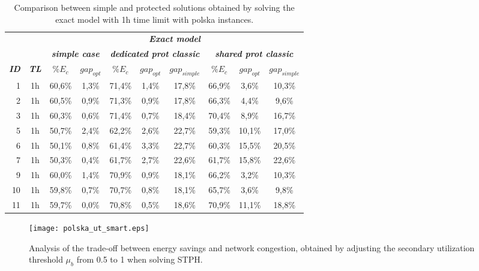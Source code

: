 \documentclass[final,5p,times,twocolumn]{elsarticle}
\begin{document}
\begin{table}[!tbp]
\centering
\scriptsize
\tabcolsep 3pt
\begin{tabular}{rccccccccc}
& & \multicolumn{8}{c}{\textbf{\textit{Exact model}}} \\
\cline{3-10}
& & \multicolumn{2}{c}{\textbf{\textit{simple case}}} & \multicolumn{3}{c}{\textbf{\textit{dedicated prot classic}}} & \multicolumn{3}{c}{\textbf{\textit{shared prot classic}}}  \\ 
\hline
\textbf{\textit{ID}} & \textbf{\textit{TL}} & \textbf{\textit{$\%E_c$}} & \textbf{\textit{$gap_{opt}$}} & \textbf{\textit{$\%E_c$}} & \textbf{\textit{$gap_{opt}$}} & \textbf{\textit{$gap_{simple}$}} & \textbf{\textit{$\%E_c$}} & \textbf{\textit{$gap_{opt}$}} & \textbf{\textit{$gap_{simple}$}} \\ 
\hline
1 & 1h & 60,6\% & 1,3\% & 71,4\% & 1,4\% & 17,8\% & 66,9\% & 3,6\% & 10,3\%   \\
2 & 1h & 60,5\% & 0,9\% & 71,3\% & 0,9\% & 17,8\% & 66,3\% & 4,4\% & 9,6\%    \\ 
3 & 1h & 60,3\% & 0,6\% & 71,4\% & 0,7\% & 18,4\% & 70,4\% & 8,9\% & 16,7\%   \\
5 & 1h & 50,7\% & 2,4\% & 62,2\% & 2,6\% & 22,7\% & 59,3\% & 10,1\% & 17,0\%  \\
6 & 1h & 50,1\% & 0,8\% & 61,4\% & 3,3\% & 22,7\% & 60,3\% & 15,5\% & 20,5\%  \\
7 & 1h & 50,3\% & 0,4\% & 61,7\% & 2,7\% & 22,6\% & 61,7\% & 15,8\% & 22,6\%  \\
9 & 1h & 60,0\% & 1,4\% & 70,9\% & 0,9\% & 18,1\% & 66,2\% & 3,2\% & 10,3\%   \\
10 & 1h & 59,8\% & 0,7\% & 70,7\% & 0,8\% & 18,1\% & 65,7\% & 3,6\% & 9,8\%   \\
11 & 1h & 59,7\% & 0,0\% & 70,8\% & 0,5\% & 18,6\% & 70,9\% & 11,1\% & 18,8\% \\
\end{tabular}
\caption{Comparison between simple and protected solutions obtained by solving the exact model with 1h time limit with polska instances.}
\label{tab:polska_model_protected}
\end{table}


\begin{figure*}[!ht]\centering
  \texttt{[image: polska\_ut\_smart.eps]}
  \caption{Analysis of the trade-off between energy savings and network congestion, obtained by adjusting the secondary utilization threshold $\mu_b$ from 0.5 to 1 when solving STPH.}
\label{fig:trade-off}
\end{figure*}
\end{document}
